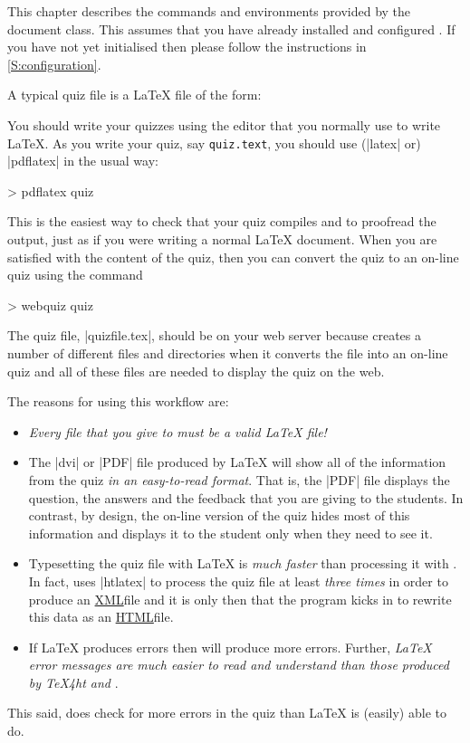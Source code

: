 \documentclass[svgnames]{article}
\newcommand{\HTML}{\href{https://www.w3schools.com/html/html_intro.asp}{HTML}}
\newcommand\XML{\href{https://www.w3schools.com/xml/xml_whatis.asp}{XML}}
\begin{document}
  This chapter describes the commands and environments provided by the
  \WebQuiz document class. This assumes that you have already installed
  and configured \WebQuiz. If you have not yet initialised \WebQuiz
  then please follow the instructions in \autoref{S:configuration}.

  A typical \WebQuiz quiz file is a \LaTeX{} file of the form:


  \noindent You should write your quizzes using the editor that you
  normally use to write \LaTeX. As you write your quiz, say
  \texttt{quiz.text}, you should use (\BashCode|latex| or)
  \BashCode|pdflatex| in the usual way:
  \begin{bashcode}
      > pdflatex quiz
  \end{bashcode}
  This is the easiest way to check that your quiz compiles and to
  proofread the output, just as if you were writing a normal \LaTeX{}
  document. When you are satisfied with the content of the quiz, then
  you can convert the quiz to an on-line quiz using the command
  \begin{bashcode}
     > webquiz quiz
  \end{bashcode}
  The quiz file, \BashCode|quizfile.tex|, should be on your web server
  because \WebQuiz creates a number of different files and directories
  when it converts the file into an on-line quiz and all of these files
  are needed to display the quiz on the web.

  The reasons for using this workflow are:
  \begin{itemize}
    \item \textit{Every file that you give to \WebQuiz must be a valid
    \LaTeX{} file!}

    \item The \BashCode|dvi| or \BashCode|PDF| file produced by \LaTeX{}
    will show all of the information from the quiz
    \textit{in an easy-to-read format}. That is, the \BashCode|PDF| file
    displays the question, the answers and the feedback that you are
    giving to the students. In contrast, by design, the on-line version
    of the quiz hides most of this information and displays it to the
    student only when they need to see it.

    \item Typesetting the quiz file with \LaTeX{} is \textit{much
    faster} than processing it with \WebQuiz. In fact, \WebQuiz uses
    \BashCode|htlatex| to process the quiz file at least
    \textit{three times} in order to produce an \XML file and it is only
    then that the \WebQuiz program kicks in to rewrite this data as an
    \HTML file.

    \item If \LaTeX{} produces errors then \WebQuiz will produce more
    errors. Further, \textit{\LaTeX{} error messages are much easier to
    read and understand than those produced by \TeX4ht and \WebQuiz}.
  \end{itemize}
  This said, \WebQuiz does check for more errors in the quiz than
  \LaTeX{} is (easily) able to do.
\end{document}
